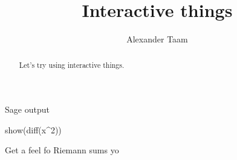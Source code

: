 \documentclass{ximera}
\title{Interactive things}
\author{Alexander Taam}
\begin{document}
\begin{abstract}
  Let's try using interactive things.
\end{abstract}
\maketitle

Sage output

	\begin{sageCell}
	show(diff(x^2))
	\end{sageCell}


Get a feel fo Riemann sums yo

\end{document}
